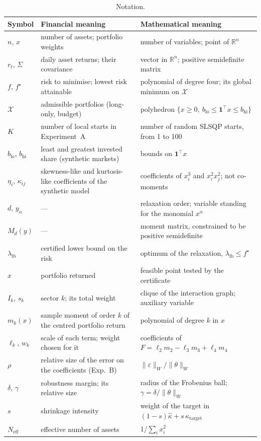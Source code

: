 \documentclass[11pt,a4paper]{article}
\newcommand{\R}{\mathbb{R}}
\newcommand{\lb}{\lambda_{\mathrm{lb}}}
\begin{document}
\begin{table}[t]
\centering\footnotesize
\caption{Notation.}\label{tab:not}
\begin{tabular}{p{1.9cm}p{5.6cm}p{6.7cm}}
\toprule
Symbol & Financial meaning & Mathematical meaning\\
\midrule
$n$, $x$ & number of assets; portfolio weights & number of variables; point of $\R^n$\\
$r_t$, $\Sigma$ & daily asset returns; their covariance & vector in $\R^n$; positive semidefinite matrix\\
$f$, $f^\star$ & risk to minimise; lowest risk attainable & polynomial of degree four; its global minimum on $\mathcal{X}$\\
$\mathcal{X}$ & admissible portfolios (long-only, budget) & polyhedron $\{x\ge0,\ b_{\mathrm{lo}}\le\mathbf 1^\top x\le b_{\mathrm{hi}}\}$\\
$K$ & number of local starts in Experiment~A & number of random SLSQP starts, from 1 to 100\\
$b_{\mathrm{lo}}$, $b_{\mathrm{hi}}$ & least and greatest invested share (synthetic markets) & bounds on $\mathbf 1^\top x$\\
$\eta_i$, $\kappa_{ij}$ & skewness-like and kurtosis-like coefficients of the synthetic model & coefficients of $x_i^3$ and $x_i^2x_j^2$; not co-moments\\
$d$, $y_\alpha$ & --- & relaxation order; variable standing for the monomial $x^\alpha$\\
$M_d(y)$ & --- & moment matrix, constrained to be positive semidefinite\\
$\lb$ & certified lower bound on the risk & optimum of the relaxation, $\lb\le f^\star$\\
$\hat x$ & portfolio returned & feasible point tested by the certificate\\
$I_k$, $s_k$ & sector $k$; its total weight & clique of the interaction graph; auxiliary variable\\
$m_k(x)$ & sample moment of order $k$ of the centred portfolio return & polynomial of degree $k$ in $x$\\
$\ell_k$, $w_k$ & scale of each term; weight chosen for it & coefficients of $F=\ell_2m_2-\ell_3m_3+\ell_4m_4$\\
$\rho$ & relative size of the error on the coefficients (Exp.~B) & $\|\varepsilon\|_W/\|\theta\|_W$\\
$\delta$, $\gamma$ & robustness margin; its relative size & radius of the Frobenius ball; $\gamma=\delta/\|\theta\|_W$\\
$s$ & shrinkage intensity & weight of the target in $(1-s)\hat\kappa+s\,\kappa_{\mathrm{target}}$\\
$N_{\mathrm{eff}}$ & effective number of assets & $1/\sum_ix_i^2$\\
\bottomrule
\end{tabular}
\end{table}
\end{document}
